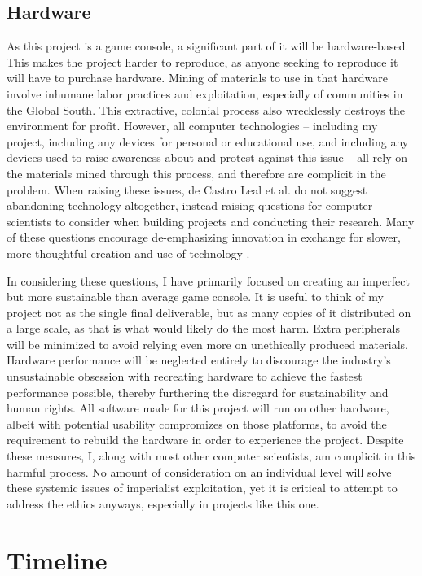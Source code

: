 \documentclass[10pt,twocolumn]{article}
\begin{document}
\subsection{Hardware}

As this project is a game console, a significant part of it will be
hardware-based. This makes the project harder to reproduce, as anyone seeking to
reproduce it will have to purchase hardware. Mining of materials to use in that
hardware involve inhumane labor practices and exploitation, especially of
communities in the Global South. This extractive, colonial process also
wrecklessly destroys the environment for profit. However, all computer
technologies -- including my project, including any devices for personal or
educational use, and including any devices used to raise awareness about and
protest against this issue -- all rely on the materials mined through this
process, and therefore are complicit in the problem. When raising these issues,
de Castro Leal et al. do not suggest abandoning technology altogether, instead
raising questions for computer scientists to consider when building projects and
conducting their research. Many of these questions encourage de-emphasizing
innovation in exchange for slower, more thoughtful creation and use of
technology \cite{de_castro_leal_into_2021}.

In considering these questions, I have primarily focused on creating an
imperfect but more sustainable than average game console. It is useful to think
of my project not as the single final deliverable, but as many copies of it
distributed on a large scale, as that is what would likely do the most harm.
Extra peripherals will be minimized to avoid relying even more on unethically
produced materials. Hardware performance will be neglected entirely to
discourage the industry's unsustainable obsession with recreating hardware to
achieve the fastest performance possible, thereby furthering the disregard for
sustainability and human rights. All software made for this project will run on
other hardware, albeit with potential usability compromizes on those platforms,
to avoid the requirement to rebuild the hardware in order to experience the
project. Despite these measures, I, along with most other computer scientists,
am complicit in this harmful process. No amount of consideration on an
individual level will solve these systemic issues of imperialist exploitation,
yet it is critical to attempt to address the ethics anyways, especially in
projects like this one.

\section{Timeline}
\end{document}
